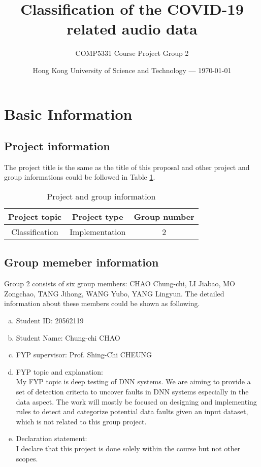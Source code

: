 \documentclass[11pt]{article}
\title{Classification of the COVID-19 related audio data} %
\author{COMP5331 Course Project Group 2 } %
\date{Hong Kong University of Science and Technology --- \today} %
\begin{document}
\maketitle %


\section{Basic Information} 
\subsection{Project information}
The project title is the same as the title of this proposal and other project and 
group informations could be followed in Table \ref{tab1}.
\begin{table}[!htbp]
	\caption{Project and group information} \centering
	\label{tab1}
	\begin{tabular}{ccc}
	\toprule[1.5pt]
	Project topic  & Project type & Group number \\
    \midrule[1pt]
    Classification & Implementation & 2 \\
	\bottomrule[1.5pt]
	\end{tabular}
\end{table}

\subsection{Group memeber information}
Group 2 consists of  six group members: CHAO Chung-chi, LI Jiabao, MO Zongchao, TANG Jihong, 
WANG Yubo, YANG Lingyun. The detailed information about these members could be shown as 
following. 

\begin{member}
	\begin{enumerate}[(a)]
		\item Student ID: 20562119
		\item Student Name: Chung-chi CHAO
		\item FYP supervisor: Prof. Shing-Chi CHEUNG
		\item FYP topic and explanation: \\
		My FYP topic is deep testing of DNN systems. We are aiming to provide a set of detection criteria to uncover faults in DNN systems especially in the data aspect. The work will mostly be focused on designing and implementing rules to detect and categorize potential data faults given an input dataset, which is not related to this group project.
		\item Declaration statement: \\
		I declare that this project is done solely within the course but not other scopes.
	\end{enumerate}
\end{member}
\end{document}
